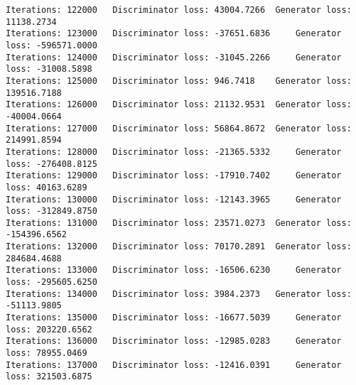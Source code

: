 \documentclass[11pt]{article}
\begin{document}
\begin{Verbatim}[commandchars=\\\{\}]
Iterations: 122000	 Discriminator loss: 43004.7266	 Generator loss: 11138.2734
Iterations: 123000	 Discriminator loss: -37651.6836	 Generator loss: -596571.0000
Iterations: 124000	 Discriminator loss: -31045.2266	 Generator loss: -31008.5898
Iterations: 125000	 Discriminator loss: 946.7418	 Generator loss: 139516.7188
Iterations: 126000	 Discriminator loss: 21132.9531	 Generator loss: -40004.0664
Iterations: 127000	 Discriminator loss: 56864.8672	 Generator loss: 214991.8594
Iterations: 128000	 Discriminator loss: -21365.5332	 Generator loss: -276408.8125
Iterations: 129000	 Discriminator loss: -17910.7402	 Generator loss: 40163.6289
Iterations: 130000	 Discriminator loss: -12143.3965	 Generator loss: -312849.8750
Iterations: 131000	 Discriminator loss: 23571.0273	 Generator loss: -154396.6562
Iterations: 132000	 Discriminator loss: 70170.2891	 Generator loss: 284684.4688
Iterations: 133000	 Discriminator loss: -16506.6230	 Generator loss: -295605.6250
Iterations: 134000	 Discriminator loss: 3984.2373	 Generator loss: -51113.9805
Iterations: 135000	 Discriminator loss: -16677.5039	 Generator loss: 203220.6562
Iterations: 136000	 Discriminator loss: -12985.0283	 Generator loss: 78955.0469
Iterations: 137000	 Discriminator loss: -12416.0391	 Generator loss: 321503.6875

    \end{Verbatim}
\end{document}
